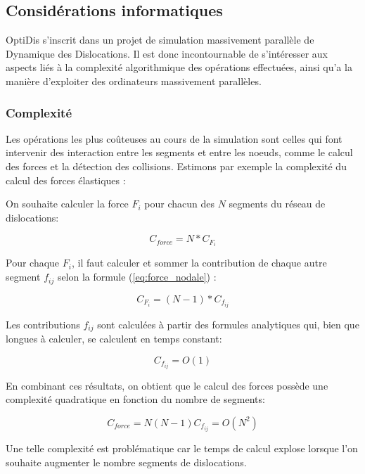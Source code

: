 \documentclass[11pt,class=article,float=false,crop=false]{standalone}
\begin{document}
\subsection{Considérations informatiques}

OptiDis s'inscrit dans un projet de simulation massivement parallèle de Dynamique des Dislocations. Il est donc incontournable de s'intéresser aux aspects liés à la complexité algorithmique des opérations effectuées, ainsi qu'a la manière d'exploiter des ordinateurs massivement parallèles. 

\subsubsection{Complexité}

Les opérations les plus coûteuses au cours de la simulation sont celles qui font intervenir des interaction entre les segments et entre les noeuds, comme le calcul des forces et la détection des collisions. Estimons par exemple la complexité du calcul des forces élastiques : 


On souhaite calculer la force $F_i$ pour chacun des $N$ segments du réseau de dislocations:

\begin{equation}
	C_{force} = N*C_{F_i}
\end{equation}

Pour chaque $F_i$, il faut calculer et sommer la contribution de chaque autre segment $f_{ij}$ selon la formule (\ref{eq:force_nodale}) :

\begin{equation}
   C_{F_i} = (N-1)*C_{f_{ij}}
\end{equation}

Les contributions $f_{ij}$ sont calculées à partir des formules analytiques qui, bien que longues à calculer, se calculent en temps constant:

 \begin{equation}
 C_{f_{ij}} = O(1)
 \end{equation}
 
En combinant ces résultats, on obtient que le calcul des forces possède une complexité quadratique en fonction du nombre de segments:

\begin{equation}
C_{force} = N(N-1)C_{f_{ij}} = O(N^2)
\end{equation}

Une telle complexité est problématique car le temps de calcul explose lorsque l'on souhaite augmenter le nombre segments de dislocations.
\end{document}
